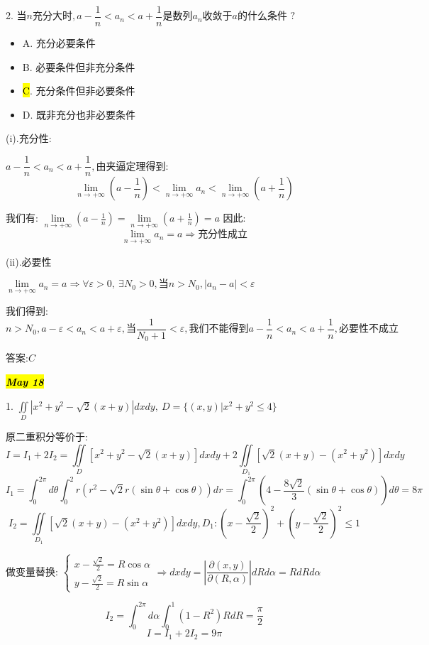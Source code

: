2. $\text{当}n\text{充分大时},a-\dfrac{1}{n}<a_{n}<a+\dfrac{1}{n}\text{是数列}a_{n}\text{收敛于}a\text{的什么条件 ?}$
\begin{itemize}
	\item A. $\text{充分必要条件}$
	\item B. $\text{必要条件但非充分条件}$
	\item \hl{C}. $\text{充分条件但非必要条件}$
	\item D. $\text{既非充分也非必要条件}$
\end{itemize}
\begin{solution}
	
	(i).充分性: 
	
	$a-\dfrac{1}{n}<a_{n}<a+\dfrac{1}{n},\text{由夹逼定理得到: }$
	$$\lim\limits_{n\rightarrow +\infty}(a-\frac{1}{n})<\lim\limits_{n\rightarrow +\infty}a_{n}<\lim\limits_{n\rightarrow +\infty}(a+\frac{1}{n})$$
	
	我们有: $\lim\limits_{n\rightarrow +\infty}(a-\frac{1}{n})=\lim\limits_{n\rightarrow +\infty}(a+\frac{1}{n})=a$
	因此: 
	$$\lim\limits_{n\rightarrow +\infty}a_{n}=a\Rightarrow\text{充分性成立}$$
	
	(ii).必要性
	
	$\lim\limits_{n\rightarrow +\infty}a_{n}=a\Rightarrow \forall \varepsilon>0,\ \exists N_{0}>0,\text{当}n>N_{0},|a_{n}-a|<\varepsilon$
	
	我们得到: 
	$$n>N_{0},a-\varepsilon<a_{n}<a+\varepsilon,\text{当}\frac{1}{N_{0}+1}<\varepsilon,\text{我们不能得到}a-\frac{1}{n}<a_{n}<a+\frac{1}{n},\text{必要性不成立}$$
	
	答案:$C$
\end{solution}

\hl{\textbf{\textit{May 18}}}

1. $\iint\limits_{D}|x^2+y^2-\sqrt{2}(x+y)|dxdy,\ D=\{(x,y)|x^2+y^2\leq 4\}$
\begin{solution}
	
	原二重积分等价于: 
	$$I=I_{1}+2I_{2}=\iint\limits_{D}[x^2+y^2-\sqrt{2}(x+y)]dxdy+2\iint\limits_{D_{1}}[\sqrt{2}(x+y)-(x^2+y^2)]dxdy$$
	$$I_{1}=\int_{0}^{2\pi}d\theta\int_{0}^{2}r(r^2-\sqrt{2}r(\sin \theta+\cos \theta))dr=\int_{0}^{2\pi}(4-\frac{8\sqrt{2}}{3}(\sin\theta+\cos\theta))d\theta=8\pi$$
	$$I_{2}=\iint\limits_{D_{1}}[\sqrt{2}(x+y)-(x^2+y^2)]dxdy,D_{1}: (x-\frac{\sqrt{2}}{2})^2+(y-\frac{\sqrt{2}}{2})^2\leq 1$$
	
	做变量替换: $\left\lbrace 
	\begin{array}{l}
		x-\frac{\sqrt{2}}{2}=R\cos \alpha\\
		y-\frac{\sqrt{2}}{2}=R\sin \alpha
	\end{array}
	\right. \Rightarrow dxdy=\left| \dfrac{\partial (x,y)}{\partial (R,\alpha)}\right| dRd\alpha=RdRd\alpha$
	
	$$I_{2}=\int_{0}^{2\pi}d\alpha\int_{0}^{1} (1-R^2)RdR=\frac{\pi}{2}$$
	$$I=I_{1}+2I_{2}=9\pi$$
\end{solution}

